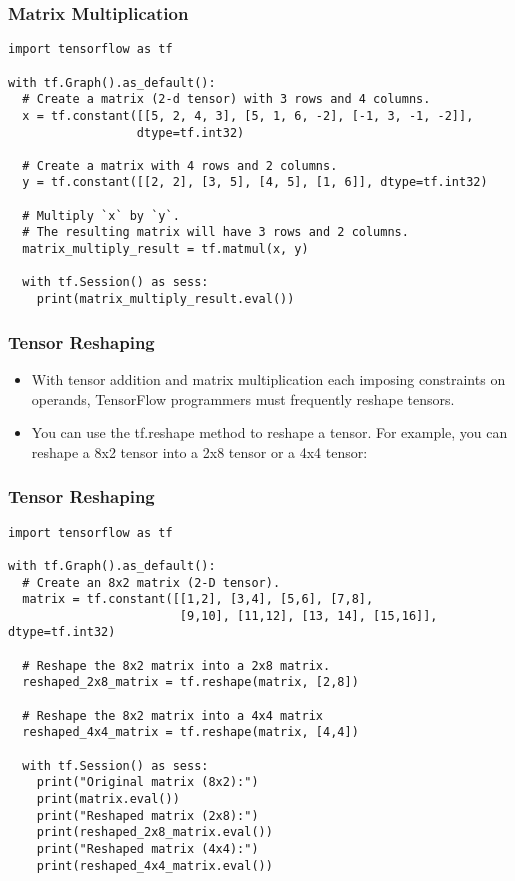 \begin{frame}[fragile] \frametitle{Matrix Multiplication}
\begin{lstlisting}
import tensorflow as tf

with tf.Graph().as_default():
  # Create a matrix (2-d tensor) with 3 rows and 4 columns.
  x = tf.constant([[5, 2, 4, 3], [5, 1, 6, -2], [-1, 3, -1, -2]],
                  dtype=tf.int32)

  # Create a matrix with 4 rows and 2 columns.
  y = tf.constant([[2, 2], [3, 5], [4, 5], [1, 6]], dtype=tf.int32)

  # Multiply `x` by `y`. 
  # The resulting matrix will have 3 rows and 2 columns.
  matrix_multiply_result = tf.matmul(x, y)

  with tf.Session() as sess:
    print(matrix_multiply_result.eval())
\end{lstlisting}

\end{frame}

\begin{frame}[fragile] \frametitle{Tensor Reshaping}
\begin{itemize}
\item With tensor addition and matrix multiplication each imposing constraints on operands, TensorFlow programmers must frequently reshape tensors.
\item You can use the tf.reshape method to reshape a tensor. For example, you can reshape a 8x2 tensor into a 2x8 tensor or a 4x4 tensor:
\end{itemize}

\end{frame}


\begin{frame}[fragile] \frametitle{Tensor Reshaping}
\begin{lstlisting}
import tensorflow as tf

with tf.Graph().as_default():
  # Create an 8x2 matrix (2-D tensor).
  matrix = tf.constant([[1,2], [3,4], [5,6], [7,8],
                        [9,10], [11,12], [13, 14], [15,16]], dtype=tf.int32)

  # Reshape the 8x2 matrix into a 2x8 matrix.
  reshaped_2x8_matrix = tf.reshape(matrix, [2,8])
  
  # Reshape the 8x2 matrix into a 4x4 matrix
  reshaped_4x4_matrix = tf.reshape(matrix, [4,4])

  with tf.Session() as sess:
    print("Original matrix (8x2):")
    print(matrix.eval())
    print("Reshaped matrix (2x8):")
    print(reshaped_2x8_matrix.eval())
    print("Reshaped matrix (4x4):")
    print(reshaped_4x4_matrix.eval())
\end{lstlisting}

\end{frame}


